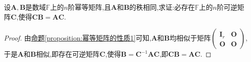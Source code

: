 \documentclass[../../main.tex]{subfiles}%
\begin{document}
\begin{example}
设\(\boldsymbol{A},\boldsymbol{B}\)是数域\(\mathbb{F}\)上的\(n\)阶幂等矩阵,且\(\boldsymbol{A}\)和\(\boldsymbol{B}\)的秩相同,求证:必存在\(\mathbb{F}\)上的\(n\)阶可逆矩阵\(\boldsymbol{C}\),使得\(\boldsymbol{C}\boldsymbol{B}=\boldsymbol{A}\boldsymbol{C}\).
\end{example}
\begin{proof}

由\hyperref[proposition:幂等矩阵的性质1]{命题\ref{proposition:幂等矩阵的性质1}}可知,\(\boldsymbol{A}\)和\(\boldsymbol{B}\)均相似于矩阵\(\begin{pmatrix}\boldsymbol{I}_r&\boldsymbol{O}\\ \boldsymbol{O}&\boldsymbol{O}\end{pmatrix}\),于是\(\boldsymbol{A}\)和\(\boldsymbol{B}\)相似,即存在可逆矩阵\(\boldsymbol{C}\),使得\(\boldsymbol{B}=\boldsymbol{C}^{-1}\boldsymbol{A}\boldsymbol{C}\),即\(\boldsymbol{C}\boldsymbol{B}=\boldsymbol{A}\boldsymbol{C}\).

\end{proof}
\end{document}
